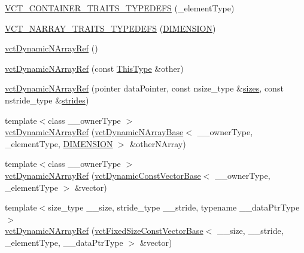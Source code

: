 \begin{DoxyCompactItemize}
\item 
\hyperlink{classvct_dynamic_n_array_ref_ad2da5cb95e277dfa7a702f1f25a0763d}{V\-C\-T\-\_\-\-C\-O\-N\-T\-A\-I\-N\-E\-R\-\_\-\-T\-R\-A\-I\-T\-S\-\_\-\-T\-Y\-P\-E\-D\-E\-F\-S} (\-\_\-element\-Type)
\item 
\hyperlink{classvct_dynamic_n_array_ref_ab95c858c7e624778f49fcd50a59fcfa9}{V\-C\-T\-\_\-\-N\-A\-R\-R\-A\-Y\-\_\-\-T\-R\-A\-I\-T\-S\-\_\-\-T\-Y\-P\-E\-D\-E\-F\-S} (\hyperlink{classvct_dynamic_n_array_ref_a92161a3e7a42576d3442eaf7bae097c1aa639cdab72a595c9cb324af98946bab5}{D\-I\-M\-E\-N\-S\-I\-O\-N})
\item 
\hyperlink{classvct_dynamic_n_array_ref_a2466569633dabf250c3b8a05ada50f97}{vct\-Dynamic\-N\-Array\-Ref} ()
\item 
\hyperlink{classvct_dynamic_n_array_ref_abecd30d0c81e3b4376bd7a5eec25ecfe}{vct\-Dynamic\-N\-Array\-Ref} (const \hyperlink{classvct_dynamic_n_array_ref_a157266ffe0ad737f4df13dcf499a4494}{This\-Type} \&other)
\item 
\hyperlink{classvct_dynamic_n_array_ref_a05a3c06ced792e3c0cbb4b6c07752063}{vct\-Dynamic\-N\-Array\-Ref} (pointer data\-Pointer, const nsize\-\_\-type \&\hyperlink{classvct_dynamic_const_n_array_base_aa86793343d80325ba5671bc24a2e0e8f}{sizes}, const nstride\-\_\-type \&\hyperlink{classvct_dynamic_const_n_array_base_a6608baee60a448ccb9598417c487cde2}{strides})
\item 
{\footnotesize template$<$class \-\_\-\-\_\-owner\-Type $>$ }\\\hyperlink{classvct_dynamic_n_array_ref_a8654ce059ffe4e87e449150758dec1e3}{vct\-Dynamic\-N\-Array\-Ref} (\hyperlink{classvct_dynamic_n_array_base}{vct\-Dynamic\-N\-Array\-Base}$<$ \-\_\-\-\_\-owner\-Type, \-\_\-element\-Type, \hyperlink{classvct_dynamic_n_array_ref_a92161a3e7a42576d3442eaf7bae097c1aa639cdab72a595c9cb324af98946bab5}{D\-I\-M\-E\-N\-S\-I\-O\-N} $>$ \&other\-N\-Array)
\item 
{\footnotesize template$<$class \-\_\-\-\_\-owner\-Type $>$ }\\\hyperlink{classvct_dynamic_n_array_ref_a0331ff18df812b9d206c94207368258a}{vct\-Dynamic\-N\-Array\-Ref} (\hyperlink{classvct_dynamic_const_vector_base}{vct\-Dynamic\-Const\-Vector\-Base}$<$ \-\_\-\-\_\-owner\-Type, \-\_\-element\-Type $>$ \&vector)
\item 
{\footnotesize template$<$size\-\_\-type \-\_\-\-\_\-size, stride\-\_\-type \-\_\-\-\_\-stride, typename \-\_\-\-\_\-data\-Ptr\-Type $>$ }\\\hyperlink{classvct_dynamic_n_array_ref_a09e261261cb97abb0f5d1f801a82bd56}{vct\-Dynamic\-N\-Array\-Ref} (\hyperlink{classvct_fixed_size_const_vector_base}{vct\-Fixed\-Size\-Const\-Vector\-Base}$<$ \-\_\-\-\_\-size, \-\_\-\-\_\-stride, \-\_\-element\-Type, \-\_\-\-\_\-data\-Ptr\-Type $>$ \&vector)

\end{DoxyCompactItemize}
